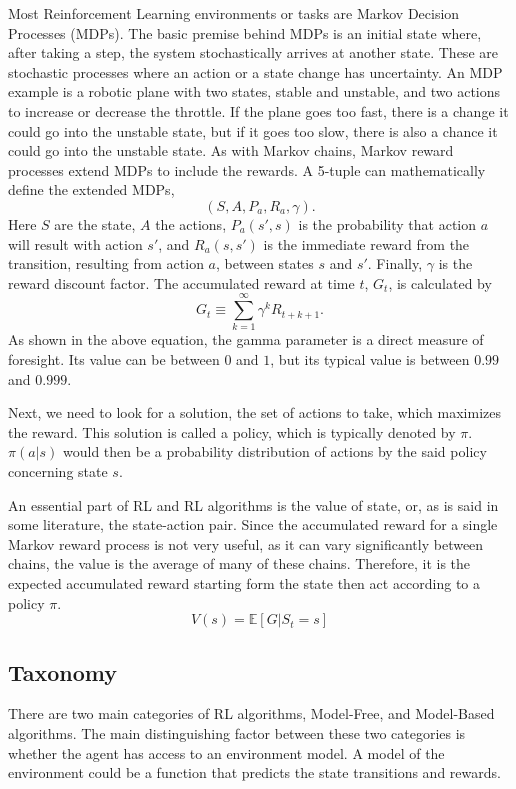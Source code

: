 Most Reinforcement Learning environments or tasks are Markov Decision Processes (MDPs). The basic premise behind MDPs is an initial state where, after taking a step, the system stochastically arrives at another state. These are stochastic processes where an action or a state change has uncertainty. An MDP example is a robotic plane with two states, stable and unstable, and two actions to increase or decrease the throttle. If the plane goes too fast, there is a change it could go into the unstable state, but if it goes too slow, there is also a chance it could go into the unstable state. As with Markov chains, Markov reward processes extend MDPs to include the rewards.
A 5-tuple can mathematically define the extended MDPs, $$(S, A, P_a, R_a, \gamma).$$ Here $S$ are the state, $A$ the actions, $P_a(s',s)$ is the probability that action $a$ will result with action $s'$, and $R_a(s,s')$ is the immediate reward from the transition, resulting from action $a$, between states $s$ and $s'$. Finally, $\gamma$ is the reward discount factor. The accumulated reward at time $t$, $G_t$, is calculated by $$G_t\equiv \sum_{k=1}^\infty \gamma^k R_{t+k+1}.$$ As shown in the above equation, the gamma parameter is a direct measure of foresight. Its value can be between $0$ and $1$, but its typical value is between $0.99$ and $0.999$.

Next, we need to look for a solution, the set of actions to take, which maximizes the reward. This solution is called a policy, which is typically denoted by $\pi$. $\pi(a|s)$ would then be a probability distribution of actions by the said policy concerning state $s$. 

An essential part of RL and RL algorithms is the value of state, or, as is said in some literature, the state-action pair. Since the accumulated reward for a single Markov reward process is not very useful, as it can vary significantly between chains, the value is the average of many of these chains. Therefore, it is the expected accumulated reward starting form the state then act according to a policy $\pi$. $$V(s)=\mathbb{E}[G|S_t=s]$$ 

\subsection{Taxonomy}

There are two main categories of RL algorithms, Model-Free, and Model-Based algorithms. The main distinguishing factor between these two categories is whether the agent has access to an environment model. A model of the environment could be a function that predicts the state transitions and rewards.

